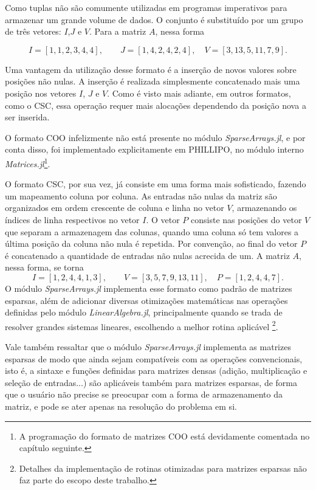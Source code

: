 Como tuplas não são comumente utilizadas em programas imperativos para armazenar um grande volume de dados. O conjunto é substituído por um grupo de três vetores: $I$,$J$ e $V$. Para a matriz $A$, nessa forma


\begin{equation}
    I =  [1, 1, 2, 3, 4, 4], \qquad J = [1, 4, 2, 4, 2, 4], \quad V = [3, 13, 5, 11, 7, 9].
    \label{eq:coo_2}
\end{equation}

Uma vantagem da utilização desse formato é a inserção de novos valores sobre posições não nulas. A inserção é realizada simplesmente concatenado mais uma posição nos vetores $I$, $J$ e $V$. Como é visto mais adiante, em outros formatos, como o CSC, essa operação requer mais alocações dependendo da posição nova a ser inserida.

O formato COO infelizmente não está presente no módulo \emph{SparseArrays.jl}, e por conta disso, foi implementado explicitamente em PHILLIPO, no módulo interno \emph{Matrices.jl}\footnote{A programação do formato de matrizes COO está devidamente comentada no capítulo seguinte.}.

O formato CSC, por sua vez, já consiste em uma forma mais sofisticado, fazendo um mapeamento coluna por coluna. As entradas não nulas da matriz são organizados em ordem crescente  de coluna e linha no vetor $V$, armazenando os índices de linha respectivos no vetor $I$. O vetor $P$ consiste nas posições do vetor $V$ que separam a armazenagem das colunas, quando uma coluna só tem valores a última posição da coluna não nula é repetida. Por convenção, ao final do vetor $P$ é concatenado a quantidade de entradas não nulas acrecida de um. A matriz $A$, nessa forma, se torna
\begin{equation}
    I = [1, 2, 4, 4, 1, 3], \qquad V = [3, 5, 7, 9, 13, 11], \quad P = [1,2,4,4,7].
    \label{eq:coo_3}
\end{equation}
O módulo \emph{SparseArrays.jl} implementa esse formato como padrão de matrizes esparsas, além de adicionar diversas otimizações matemáticas nas operações definidas pelo módulo \emph{LinearAlgebra.jl}, principalmente quando se trada de resolver grandes sistemas lineares, escolhendo a melhor rotina aplicável \footnote{Detalhes da implementação de rotinas otimizadas para matrizes esparsas não faz parte do escopo deste trabalho.}.

Vale também ressaltar que o módulo \emph{SparseArrays.jl} implementa as matrizes esparsas de modo que ainda sejam compatíveis com as operações convencionais, isto é, a sintaxe e funções definidas para matrizes densas (adição, multiplicação e seleção de entradas...) são aplicáveis também para matrizes esparsas, de forma que o usuário não precise se preocupar com a forma de armazenamento da matriz, e pode se ater apenas na resolução do problema em si.


